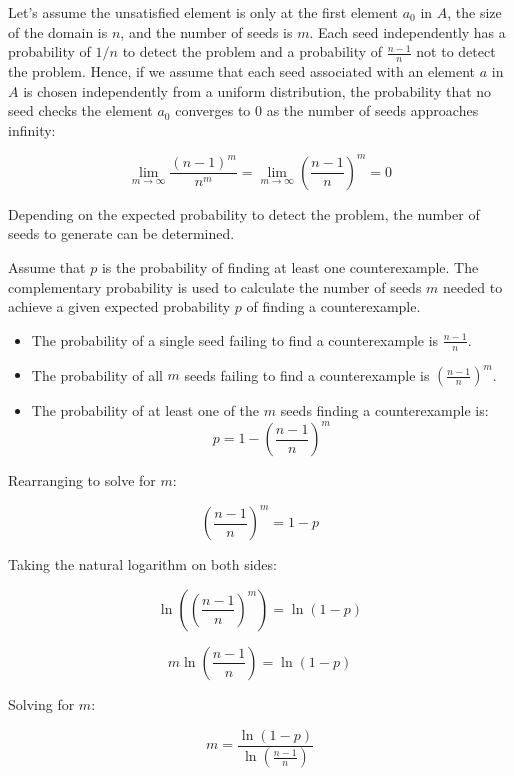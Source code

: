 \documentclass[runningheads]{llncs}
\begin{document}
Let's assume the unsatisfied element is only at the first element $a_0$ in $A$, the size of the domain is $n$, and the number of seeds is $m$. Each seed independently has a probability of $1/n$ to detect the problem and a probability of $\frac{n-1}{n}$ not to detect the problem. Hence, if we assume that each seed associated with an element $a$ in $A$ is chosen independently from a uniform distribution, the probability that no seed checks the element $a_0$ converges to $0$ as the number of seeds approaches infinity:

\[
  \lim_{m \to \infty} \frac{(n-1)^m}{n^m} = \lim_{m \to \infty} \left( \frac{n-1}{n} \right)^m = 0
\]

Depending on the expected probability to detect the problem, the number of seeds to generate can be determined. 

Assume that $p$ is the probability of finding at least one counterexample. The complementary probability is used to calculate the number of seeds $m$ needed to achieve a given expected probability $p$ of finding a counterexample.
\begin{itemize}
\item The probability of a single seed failing to find a counterexample is $\frac{n-1}{n}$.
\item The probability of all $m$ seeds failing to find a counterexample is $\left(\frac{n-1}{n}\right)^m$.
\item The probability of at least one of the $m$ seeds finding a counterexample is:
\[
p = 1 - \left(\frac{n-1}{n}\right)^m
\]
\end{itemize}  

Rearranging to solve for \( m \):

\[
\left(\frac{n-1}{n}\right)^m = 1 - p
\]

Taking the natural logarithm on both sides:

\[
\ln\left(\left(\frac{n-1}{n}\right)^m\right) = \ln(1 - p)
\]

\[
m \ln\left(\frac{n-1}{n}\right) = \ln(1 - p)
\]

Solving for \( m \):

\[
m = \frac{\ln(1 - p)}{\ln\left(\frac{n-1}{n}\right)}
\]


\end{document}
